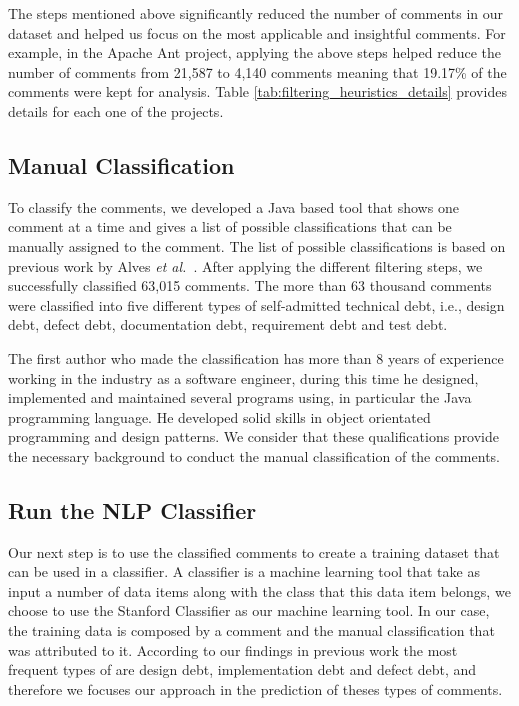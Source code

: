The steps mentioned above significantly reduced the number of comments in our dataset and helped us focus on the most applicable and insightful comments. For example, in the Apache Ant project, applying the above steps helped reduce the number of comments from 21,587 to 4,140 comments meaning that 19.17\% of the comments were kept for analysis. Table \ref{tab:filtering_heuristics_details} provides details for each one of the projects.

\subsection{Manual Classification} %
\label{sub:manual_classification}

To classify the comments, we developed a Java based tool that shows one comment at a time and gives a list of possible classifications that can be manually assigned to the comment. The list of possible classifications is based on previous work by Alves \textit{et al.}~\cite{Alves2014MTD}. After applying the different filtering steps, we successfully classified 63,015 comments. The more than 63 thousand comments were classified into five different types of self-admitted technical debt, i.e., design debt, defect debt, documentation debt, requirement debt and test debt.
 
The first author who made the classification has more than 8 years of experience working in the industry as a software engineer, during this time he designed, implemented and maintained several programs using, in particular the Java programming language. He developed solid skills in object orientated programming and design patterns. We consider that these qualifications provide the necessary background to conduct the manual classification of the comments.   


\subsection{Run the NLP Classifier} %
\label{sub:run_the_nlp_classifier}
 
Our next step is to use the classified \SATD comments to create a training dataset that can be used in a classifier. A classifier is a machine learning tool that take as input a number of data items along with the class that this data item belongs, we choose to use the Stanford Classifier  as our machine learning tool. In our case, the training data is composed by a comment and the manual classification that was attributed to it. According to our findings in previous work \cite{Maldonado2015MTD} the most frequent types of \SATD are design debt, implementation debt and defect debt, and therefore we focuses our approach in the prediction of theses types of \SATD comments.

